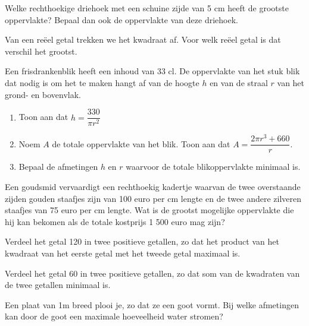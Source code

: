 \documentclass[a4paper,12pt,twoside]{article}
\begin{document}
\begin{oefening}
  Welke rechthoekige driehoek met een schuine zijde van 5 cm heeft de grootste
  oppervlakte? Bepaal dan ook de oppervlakte van deze driehoek.
\end{oefening}

\begin{oefening}
  Van een reëel getal trekken we het kwadraat af. Voor welk reëel getal is dat verschil het grootst.
\end{oefening}

\begin{oefening}
  Een frisdrankenblik heeft een inhoud van 33 cl. De oppervlakte van het stuk blik dat nodig is om het te maken hangt af van de hoogte $h$ en van de straal $r$ van het grond- en
  bovenvlak.
  \begin{enumerate}
  \item Toon aan dat $h=\dfrac{330}{\pi r^2}$
  \item Noem $A$ de totale oppervlakte van het blik. Toon aan dat $A=\dfrac{2\pi r^3 + 660}{r}$.
  \item Bepaal de afmetingen $h$ en $r$ waarvoor de totale blikoppervlakte minimaal is.
  \end{enumerate}
\end{oefening}

\begin{oefening}
  Een goudsmid vervaardigt een rechthoekig kadertje waarvan de twee overstaande zijden gouden staafjes zijn van 100 euro per cm lengte en de twee andere zilveren staafjes van 75 euro per cm lengte. Wat is de grootst mogelijke oppervlakte die hij kan bekomen als de totale kostprijs 1 500 euro mag zijn?
\end{oefening}

\begin{oefening}
  Verdeel het getal 120 in twee positieve getallen, zo dat het product van het kwadraat van het eerste getal met het tweede getal maximaal is.
\end{oefening}

\begin{oefening}
  Verdeel het getal 60 in twee positieve getallen, zo dat som van de kwadraten van de twee getallen minimaal is.
\end{oefening}

\begin{oefening}
  Een plaat van 1m breed plooi je, zo dat ze een goot vormt. Bij welke afmetingen kan door de goot een maximale hoeveelheid water stromen?
\end{oefening}
\end{document}

